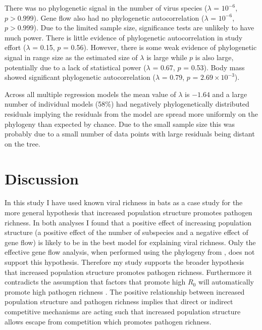 There was no phylogenetic signal in the number of virus species ($\lambda$ = \ensuremath{10^{-6}}, $p > 0.999$).
Gene flow also had no phylogenetic autocorrelation ($\lambda$ = \ensuremath{10^{-6}},  $p > 0.999$).
Due to the limited sample size, significance tests are unlikely to have much power.
There is little evidence of phylogenetic autocorrelation in study effort ($\lambda$ = 0.15, $p$ = 0.56).
However, there is some weak evidence of phylogenetic signal in range size as the estimated size of $\lambda$ is large while $p$ is also large, potentially due to a lack of statistical power ($\lambda$ = 0.67, $p$ = 0.53).
Body mass showed significant phylogenetic autocorrelation ($\lambda$ = 0.79, $p$ = \ensuremath{2.69\times 10^{-3}}).


Across all multiple regression models the mean value of $\lambda$ is \ensuremath{-1.64} and a large number of individual models (58\%)  had negatively phylogenetically distributed residuals implying the residuals from the model are spread more uniformly on the phylogeny than expected by chance.
Due to the small sample size this was probably due to a small number of data points with large residuals being distant on the tree.



\section{Discussion}  






In this study I have used known viral richness in bats as a case study for the more general hypothesis that increased population structure promotes pathogen richness.
In both analyses I found that a positive effect of increasing population structure (a positive effect of the number of subspecies and a negative effect of gene flow) is likely to be in the best model for explaining viral richness.
Only the effective gene flow analysis, when performed using the phylogeny from \textcite{jones2005bats}, does not support this hypothesis.
Therefore my study supports the broader hypothesis that increased population structure promotes pathogen richness.
Furthermore it contradicts the assumption that factors that promote high $R_0$ will automatically promote high pathogen richness \cite{nunn2003comparative, morand2000wormy}.
The positive relationship between increased population structure and pathogen richness implies that direct or indirect competitive mechanisms are acting such that increased population structure allows escape from competition which promotes pathogen richness.



